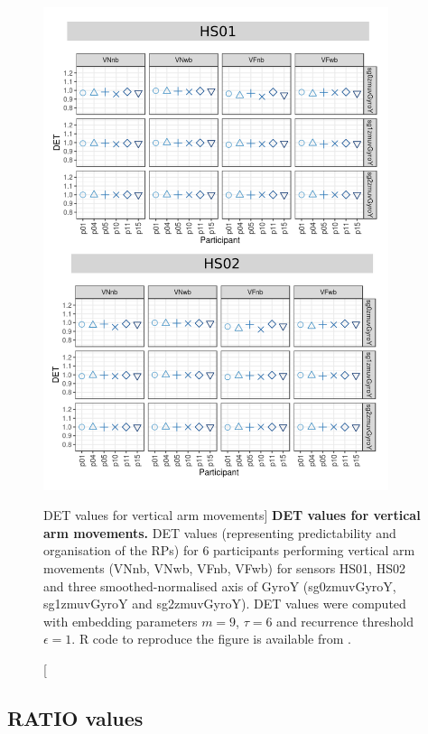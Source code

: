 \begin{figure}
\centering
\includegraphics[width=0.9\textwidth]{rqa_det_V_w500}
    \caption
	[DET values for vertical arm movements]{
	{\bf DET values for vertical arm movements.}	
    	DET values (representing predictability and organisation of the RPs)
	for 6 participants performing vertical arm movements 
	(VNnb, VNwb, VFnb, VFwb)
	for sensors HS01, HS02 and three smoothed-normalised axis 
	of GyroY (sg0zmuvGyroY, sg1zmuvGyroY and sg2zmuvGyroY).
	DET values were computed with 
	embedding parameters $m=9$, $\tau=6$ and recurrence threshold
	$\epsilon=1$.
	R code to reproduce the figure is available from \cite{hwum2018}.
        }
    \label{fig:rqa_det_V}
\end{figure}


\newpage
\subsection{RATIO values}

